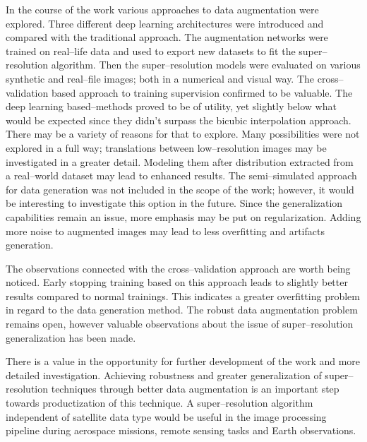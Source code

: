 In the course of the work various approaches to data augmentation were explored.
Three different deep learning architectures were introduced and compared with the traditional approach.
The augmentation networks were trained on real--life data and used to export new datasets to fit the super--resolution algorithm.
Then the super--resolution models were evaluated on various synthetic and real--file images; both in a numerical and visual way.
The cross--validation based approach to training supervision confirmed to be valuable.
The deep learning based--methods proved to be of utility, yet slightly below what would be expected since they didn't surpass the bicubic interpolation approach.
There may be a variety of reasons for that to explore.
Many possibilities were not explored in a full way; translations between low--resolution images may be investigated in a greater detail.
Modeling them after distribution extracted from a real--world dataset may lead to enhanced results.
The semi--simulated approach for data generation was not included in the scope of the work; however, it would be interesting to investigate this option in the future.
Since the generalization capabilities remain an issue, more emphasis may be put on regularization.
Adding more noise to augmented images may lead to less overfitting and artifacts generation.

The observations connected with the cross--validation approach are worth being noticed.
Early stopping training based on this approach leads to slightly better results compared to normal trainings.
This indicates a greater overfitting problem in regard to the data generation method.
The robust data augmentation problem remains open, however valuable observations about the issue of super--resolution generalization has been made.

There is a value in the opportunity for further development of the work and more detailed investigation.
Achieving robustness and greater generalization of super--resolution techniques through better data augmentation is an important step towards productization of this technique.
A super--resolution algorithm independent of satellite data type would be useful in the image  processing pipeline during aerospace missions, remote sensing tasks and Earth observations.
